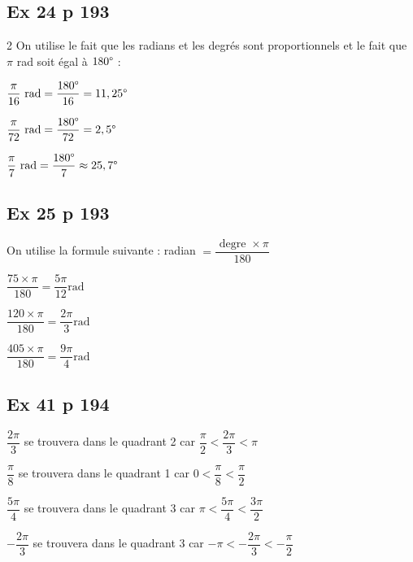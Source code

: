 \documentclass[a4paper,french]{book}
\begin{document}
\subsection*{Ex 24 p 193}
\begin{multicols}{2}
    On utilise le fait que les radians et les degrés sont proportionnels et le fait que  $\pi$ rad soit égal à $180\degree$ :
    \begin{enumMet}
        \item $\dfrac{\pi}{16}\text{\ rad}=\dfrac{180\degree}{16}=11,25\degree$
        \item $\dfrac{\pi}{72}\text{\ rad}=\dfrac{180\degree}{72}=2,5\degree$
        \item $\dfrac{\pi}{7}\text{\ rad}=\dfrac{180\degree}{7}\approx 25,7\degree$
    \end{enumMet}

\subsection*{Ex 25 p 193}
On utilise la formule suivante : radian $=\dfrac{\text { degre } \times \pi}{180}$
    \begin{enumMet}
        \item $\dfrac{75 \times \pi}{180}=\dfrac{5 \pi}{12} \mathrm{rad}$
        \item $\dfrac{120 \times \pi}{180}=\dfrac{2 \pi}{3} \mathrm{rad}$
        \item $\dfrac{405 \times \pi}{180}=\dfrac{9 \pi}{4} \mathrm{rad}$
    \end{enumMet}
\end{multicols}

 \subsection*{Ex 41 p 194}

\begin{enumMet}
    \item $\dfrac{2\pi}{3}$ se trouvera dans le quadrant 2 car $\dfrac{\pi}{2}<\dfrac{2\pi}{3}<\pi$
    \item $\dfrac{\pi}{8}$ se trouvera dans le quadrant 1 car $0<\dfrac{\pi}{8}<\dfrac{\pi}{2}$
    \item $\dfrac{5\pi}{4}$ se trouvera dans le quadrant 3 car $\pi<\dfrac{5\pi}{4}<\dfrac{3\pi}{2}$
    \item $-\dfrac{2\pi}{3}$ se trouvera dans le quadrant 3 car $-\pi<-\dfrac{2\pi}{3}<-\dfrac{\pi}{2}$
\end{enumMet}
\end{document}
